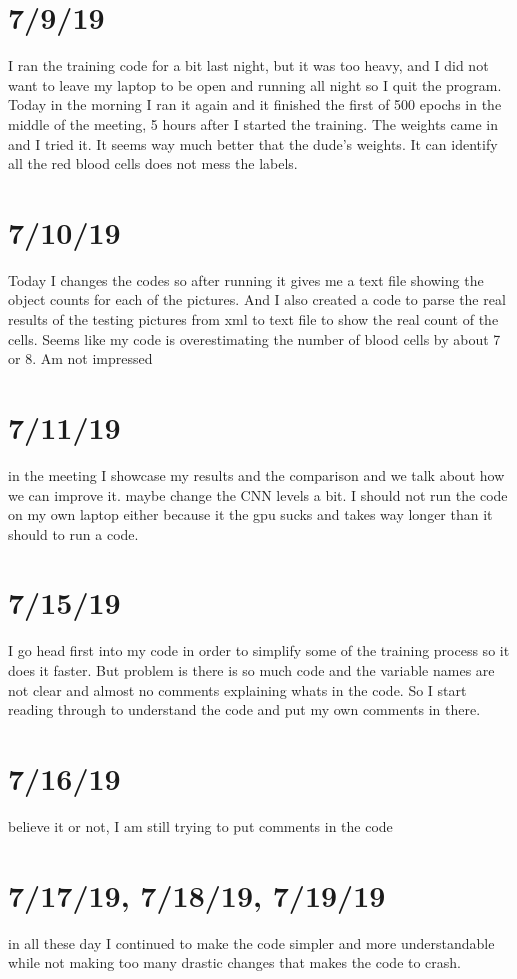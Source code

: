 \documentclass{article}
\begin{document}
\section{7/9/19}
I ran the training code for a bit last night, but it was too heavy, and I did not want to leave my laptop to be open and running all night so I quit the program. Today in the morning I ran it again and it finished the first of 500 epochs in the middle of the meeting, 5 hours after I started the training. The weights came in and I tried it. It seems way much better that the dude’s weights. It can identify all the red blood cells does not mess the labels.

\section{7/10/19}
Today I changes the codes so after running it gives me a text file showing the object counts for each of the pictures. And I also created a code to parse the real results of the testing pictures from xml to text file to show the real count of the cells. Seems like my code is overestimating the number of blood cells by about 7 or 8. Am not impressed

\section{7/11/19}
in the meeting I showcase my results and the comparison and we talk about how we can improve it. maybe change the CNN levels a bit. I should not run the code on my own laptop either because it the gpu sucks and takes way longer than it should to run a code.

\section{7/15/19}
I go head first into my code in order to simplify some of the training process so it does it faster. But problem is there is so much code and the variable names are not clear and almost no comments explaining whats in the code. So I start reading through to understand the code and put my own comments in there.

\section{7/16/19}
believe it or not, I am still trying to put comments in the code

\section{7/17/19, 7/18/19, 7/19/19}
in all these day I continued to make the code simpler and more understandable while not making too many drastic changes that makes the code to crash.
\end{document}
